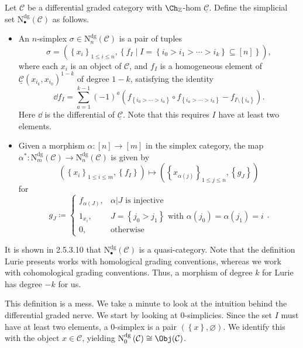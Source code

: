 \begin{definition}\label{dfn:6-1-10}
	Let $\mathcal{C} $ be a differential graded category with $\Ch_{\mathbb{Z} } $-hom $\underline{\mathcal{C} } $. Define the simplicial set $\mathrm{N}^{\mathrm{dg} }_{\bullet} (\mathcal{C} )$ as follows.
	\begin{itemize}
		\item An $n$-simplex $\sigma \in \mathrm{N} ^{\mathrm{dg} }_n(\mathcal{C} )$ is a pair of tuples
			\[
				\sigma=\left( \left\{ x_i \right\}_{1\leq i\leq n} , \left\{ f_I \mid I = \left\{ i_0 > i_1 > \cdots > i_k \right\} \subseteq [n]\right\} \right) 
			,\]
			where each $x_i$ is an object of $\mathcal{C} $, and $f_I$ is a homogeneous element of $\underline{\mathcal{C} } (x_{i_k} ,x_{i_0} )^{1-k} $ of degree $1-k$, satisfying the identity
			\[
			\dd f_I = \sum_{a=1}^{k-1} (-1)^{a} \left( f_{\left\{ i_0 > \cdots > i_a \right\} } \circ f_{\left\{i_a > \cdots > i_k\right\}} - f_{I\setminus \left\{ i_a \right\} }  \right) 
			.\]
			Here $\dd $ is the differential of $\underline{\mathcal{C} } $. Note that this requires $I$ have at least two elements.
		\item Given a morphism $\alpha : [n] \to [m]$ in the simplex category, the map $\alpha ^* : \mathrm{N} ^{\mathrm{dg}}_m(\mathcal{C} ) \to \mathrm{N} ^{\mathrm{dg} } _n(\mathcal{C} )$ is given by
			\[
				\left( \left\{ x_i \right\}_{1\leq i\leq m} ,\left\{ f_I \right\}  \right) \mapsto \left( \left\{ x_{\alpha (j)}  \right\}_{1\leq j\leq n} ,\left\{ g_J \right\}  \right) 
			\]
			for
			\[
				g_J \coloneqq 
				\begin{cases}
					f_{\alpha (J)} ,& \alpha |J\text{ is injective}\\
					1_{x_i} ,& J=\left\{ j_0 > j_1 \right\} \text{ with } \alpha (j_0)=\alpha (j_1)=i\\
					0,& \text{otherwise} 
				\end{cases}
			.\]
	\end{itemize}
\end{definition}
It is shown in \cite{kerodon} 2.5.3.10 that $\mathrm{N} ^{\mathrm{dg} }_{\bullet}(\mathcal{C} )$ is a quasi-category. Note that the definition Lurie presents works with homological grading conventions, whereas we work with cohomological grading conventions. Thus, a morphism of degree $k$ for Lurie has degree $-k$ for us.

This definition is a mess. We take a minute to look at the intuition behind the differential graded nerve. We start by looking at 0-simplicies. Since the set $I$ must have at least two elements, a 0-simplex is a pair $(\left\{ x \right\} ,\varnothing )$. We identify this with the object $x\in \mathcal{C} $, yielding $\mathrm{N} ^{\mathrm{dg} } _{0} \left( \mathcal{C}  \right) \cong \Obj(\mathcal{C} ) $.


